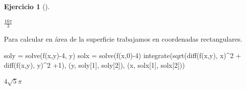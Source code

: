 \documentclass[
  a4paper,
]{scrreport}
\newenvironment{Shaded}{\begin{snugshade}}{\end{snugshade}}
\newcommand{\FloatTok}[1]{\textcolor[rgb]{0.68,0.00,0.00}{#1}}
\newcommand{\FunctionTok}[1]{\textcolor[rgb]{0.28,0.35,0.67}{#1}}
\newcommand{\NormalTok}[1]{\textcolor[rgb]{0.00,0.23,0.31}{#1}}
\newcommand{\OperatorTok}[1]{\textcolor[rgb]{0.37,0.37,0.37}{#1}}
\theoremstyle{definition}
\newtheorem{exercise}{Ejercicio}[chapter]
\theoremstyle{remark}
\begin{document}
\begin{exercise}[]
\begin{tcolorbox}
$\frac{16 \pi}{3}$

Para calcular en área de la superficie trabajamos en coordenadas
rectangulares.

\begin{Shaded}
\begin{Highlighting}[]
\NormalTok{soly }\OperatorTok{=} \FunctionTok{solve}\NormalTok{(}\FunctionTok{f}\NormalTok{(x,y)}\OperatorTok{{-}}\FloatTok{4}\NormalTok{, y)}
\NormalTok{solx }\OperatorTok{=} \FunctionTok{solve}\NormalTok{(}\FunctionTok{f}\NormalTok{(x,}\FloatTok{0}\NormalTok{)}\OperatorTok{{-}}\FloatTok{4}\NormalTok{)}
\FunctionTok{integrate}\NormalTok{(}\FunctionTok{sqrt}\NormalTok{(}\FunctionTok{diff}\NormalTok{(}\FunctionTok{f}\NormalTok{(x,y), x)}\OperatorTok{\^{}}\FloatTok{2} \OperatorTok{+} \FunctionTok{diff}\NormalTok{(}\FunctionTok{f}\NormalTok{(x,y), y)}\OperatorTok{\^{}}\FloatTok{2} \OperatorTok{+}\FloatTok{1}\NormalTok{), (y, soly[}\FloatTok{1}\NormalTok{], soly[}\FloatTok{2}\NormalTok{]), (x, solx[}\FloatTok{1}\NormalTok{], solx[}\FloatTok{2}\NormalTok{]))}
\end{Highlighting}
\end{Shaded}

$4 \sqrt{5} \pi$

\end{tcolorbox}

\end{exercise}
\end{document}
